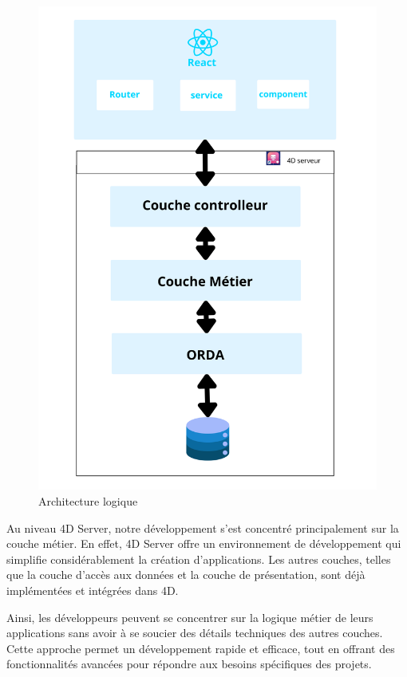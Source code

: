 \begin{figure}[htbp]
   \centering
   \includegraphics[scale=0.1]{Images/archiLogic.png} 
   \caption{Architecture logique}
   \label{fig:logiqueArch}
\end{figure}

Au niveau 4D Server, notre développement s’est concentré principalement sur la couche métier. En effet, 4D Server offre un environnement de développement qui simplifie considérablement la création d’applications. Les autres couches, telles que la couche d’accès aux données et la couche de présentation, sont déjà implémentées et intégrées dans 4D.
\newline

Ainsi, les développeurs peuvent se concentrer sur la logique métier de leurs applications sans avoir à se soucier des détails techniques des autres couches. Cette approche permet un développement rapide et eﬀicace, tout en offrant des fonctionnalités avancées pour répondre aux besoins spécifiques des projets.
\newline

